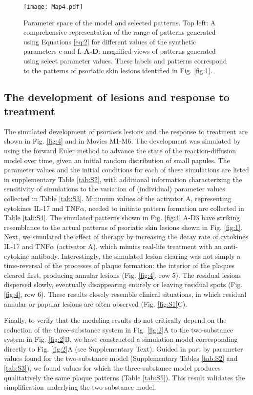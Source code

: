 \begin{figure}[h]
	\centering
	\texttt{[image: Map4.pdf]}
	\caption{Parameter space of the model and selected patterns. Top left: A comprehensive representation of the range of patterns generated using Equations \ref{eq:2} for different values of the synthetic parameters c and f. \textbf{A-D}: magnified views of patterns generated using select parameter values. These labels and patterns correspond to the patterns of psoriatic skin lesions identified in Fig. \ref{fig:1}.}
	\label{fig:3}
\end{figure}

\subsection{The development of lesions and response to treatment}
The simulated development of psoriasis lesions and the response to treatment are shown in Fig. \ref{fig:4} and in Movies M1-M6. The development was simulated by using the forward Euler method to advance the state of the reaction-diffusion model over time, given an initial random distribution of small papules. The parameter values and the initial conditions for each of these simulations are listed in supplementary Table \ref{tab:S2}, with additional information characterizing the sensitivity of simulations to the variation of (individual) parameter values collected in Table \ref{tab:S3}. Minimum values of the activator A, representing cytokines IL-17 and TNF$\alpha$, needed to initiate pattern formation are collected in Table \ref{tab:S4}. The simulated patterns shown in Fig. \ref{fig:4} A-D3 have striking resemblance to the actual patterns of psoriatic skin lesions shown in Fig. \ref{fig:1}. Next, we simulated the effect of therapy by increasing the decay rate of cytokines IL-17 and TNF$\alpha$ (activator A), which mimics real-life treatment with an anti-cytokine antibody. Interestingly, the simulated lesion clearing was not simply a time-reversal of the processes of plaque formation: the interior of the plaques cleared first, producing annular lesions (Fig. \ref{fig:4}, row 5). The residual lesions dispersed slowly, eventually disappearing entirely or leaving residual spots (Fig. \ref{fig:4}, row 6). These results closely resemble clinical situations, in which residual annular or papular lesions are often observed (Fig. \ref{fig:S1}C). 

Finally, to verify that the modeling results do not critically depend on the reduction of the three-substance system in Fig. \ref{fig:2}A to the two-substance system in Fig. \ref{fig:2}B, we have constructed a simulation model corresponding directly to Fig. \ref{fig:2}A (see Supplementary Text). Guided in part by parameter values found for the two-substance model (Supplementary Tables \ref{tab:S2} and \ref{tab:S3}), we found values for which the three-substance model produces qualitatively the same plaque patterns (Table \ref{tab:S5}). This result validates the simplification underlying the two-substance model.

